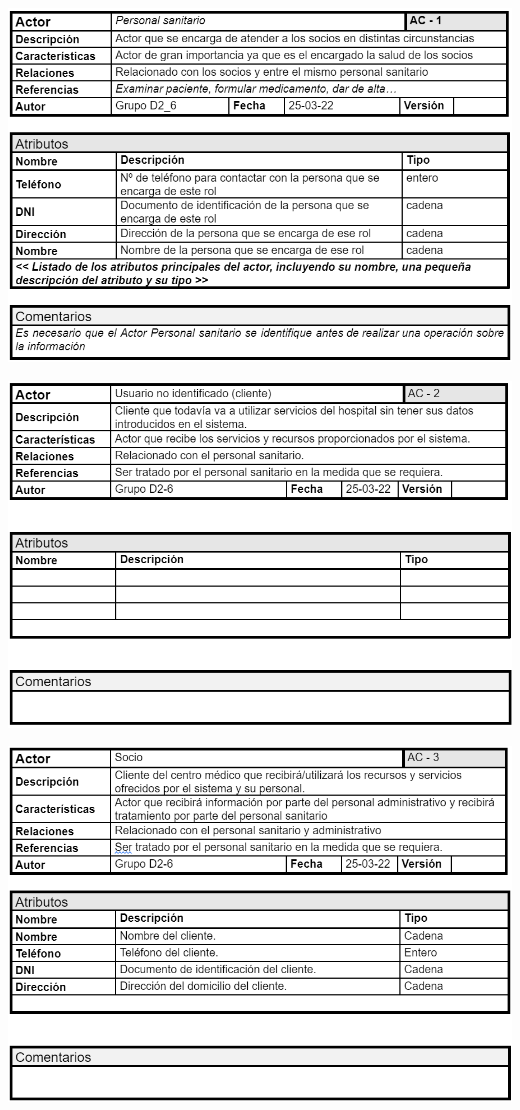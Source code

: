 \documentclass[12pt, spanish]{article}
\begin{document}
\begin{centering}\includegraphics[scale = 0.65]{Actores/Actor1.png}\\[1.0 cm]\end{centering}
\begin{centering}\includegraphics[scale = 0.65]{Actores/Actor2.png}\\[1.0 cm]\end{centering}
\begin{centering}\includegraphics[scale = 0.65]{Actores/Actor3.png}\\[1.0 cm]\end{centering}
\end{document}
